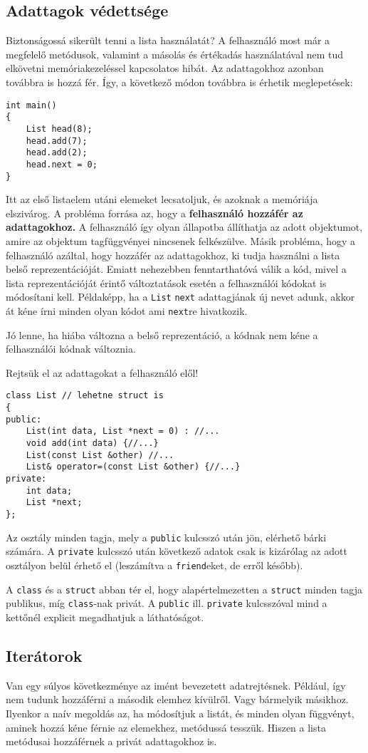 \documentclass[a4paper,11.5pt,table]{article}
\begin{document}
	\subsection{Adattagok védettsége}
	Biztonságossá sikerült tenni a lista használatát? A felhasználó most már a megfelelő metódusok, valamint a másolás és értékadás használatával nem tud elkövetni memóriakezeléssel kapcsolatos hibát. Az adattagokhoz azonban továbbra is hozzá fér. Így, a következő módon továbbra is érhetik meglepetések:
	\begin{lstlisting}
int main()
{
	List head(8);
	head.add(7);
	head.add(2);
	head.next = 0;
}
	\end{lstlisting}
	Itt az első listaelem utáni elemeket lecsatoljuk, és azoknak a memóriája elszivárog. A probléma forrása az, hogy a \textbf{felhasználó hozzáfér az adattagokhoz.} A felhasználó így olyan állapotba állíthatja az adott objektumot, amire az objektum tagfüggvényei nincsenek felkészülve. Másik probléma, hogy a felhasználó azáltal, hogy hozzáfér az adattagokhoz, ki tudja használni a lista belső reprezentációját. Emiatt nehezebben fenntarthatóvá válik a kód, mivel a lista reprezentációját érintő változtatások esetén a felhasználói kódokat is módosítani kell. Példaképp, ha a \texttt{List} \texttt{next} adattagjának új nevet adunk, akkor át kéne írni minden olyan kódot ami \texttt{next}re hivatkozik.
	
	Jó lenne, ha hiába változna a belső reprezentáció, a kódnak nem kéne a felhasználói kódnak változnia. 
	
	Rejtsük el az adattagokat a felhasználó elől!

\begin{lstlisting}
class List // lehetne struct is
{
public:
	List(int data, List *next = 0) : //...
	void add(int data) {//...}
	List(const List &other) //...
	List& operator=(const List &other) {//...}
private:
	int data;
	List *next;
};
\end{lstlisting}
  Az osztály minden tagja, mely a \texttt{public} kulcsszó után jön, elérhető bárki számára. A \texttt{private} kulcsszó után következő adatok csak is kizárólag az adott osztályon belül érhető el (leszámítva a \texttt{friend}eket, de erről később).

	A \texttt{class} és a \texttt{struct} abban tér el, hogy alapértelmezetten a \texttt{struct} minden tagja publikus, míg \texttt{class}-nak privát. A \texttt{public} ill. \texttt{private} kulcsszóval mind a kettőnél explicit megadhatjuk a láthatóságot.
	\subsection{Iterátorok}
	Van egy súlyos következménye az imént bevezetett adatrejtésnek. Például, így nem tudunk hozzáférni a második elemhez kívülről. Vagy bármelyik másikhoz. Ilyenkor a naív megoldás az, ha módosítjuk a listát, és minden olyan függvényt, aminek hozzá kéne férnie az elemekhez, metódussá tesszük. Hiszen a lista metódusai hozzáférnek a privát adattagokhoz is.
	
\end{document}
